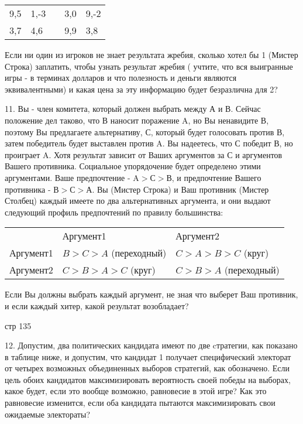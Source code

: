 \documentclass[a4paper,12pt]{article}
\begin{document}
\begin{tabular}{|l|l|l|l|l|}
\cline{1-2}\cline{4-5} 9,5 & 1,-3 &  & 3,0 & 9,-2
\\ \cline{1-2}\cline{4-5} 3,7 & 4,6 &  & 9,9 & 3,8
\\ \cline{1-2}\cline{4-5}
\end{tabular}

Если ни один из игроков не знает результата жребия,
сколько хотел бы 1 (Мистер Строка) заплатить, чтобы
узнать результат жребия ( учтите, что вся
выигранные игры - в терминах долларов и что
полезность и деньги являются эквивалентными) и
какая цена за эту информацию будет безразлична для
2?

11. Вы - член комитета, который должен выбрать
между А и В. Сейчас положение дел таково, что В
наносит поражение A, но Вы ненавидите В, поэтому Вы
предлагаете альтернативу, С, который будет
голосовать против В, затем победитель будет
выставлен против A. Вы надеетесь, что С победит В,
но проиграет A. Хотя результат зависит от Ваших
аргументов за С и аргументов Вашего противника.
Социальное упорядочение будет определено этими
аргументами. Ваше предпочтение - A$>$С$>$В, и предпочтение Вашего противника
- В$>$С$>$А. Вы (Мистер
Строка) и Ваш противник (Мистер Столбец) каждый
имеете по два альтернативных аргумента, и они
выдают следующий профиль предпочтений по правилу
большинства:

\begin{tabular}{lll}
& Аргумент1 & Аргумент2 \\ \cline{2-3} Аргумент1 &
\multicolumn{1}{|l}{$B>C>A$ (переходный)} &
\multicolumn{1}{|l|}{$C>A>B>C$ (круг)} \\
\cline{2-3} Аргумент2 &
\multicolumn{1}{|l}{$C>B>A>C$ (круг)} &
\multicolumn{1}{|l|}{$C>B>A$ (переходный)} \\
\cline{2-3}
\end{tabular}

Если Вы должны выбрать каждый аргумент, не зная что
выберет Ваш противник, и если каждый хитер, какой
результат возобладает?

стр 135

12. Допустим, два политических кандидата имеют по
две cтратегии, как показано в таблице ниже, и
допустим, что кандидат 1 получает специфический
электорат от четырех возможных объединенных выборов
стратегий, как обозначено. Если цель обоих
кандидатов максимизировать вероятность своей победы
на выборах, какое будет, если это вообще возможно,
равновесие в этой игре? Как это равновесие
изменится, если оба кандидата пытаются
максимизировать свои ожидаемые электораты?
\end{document}

